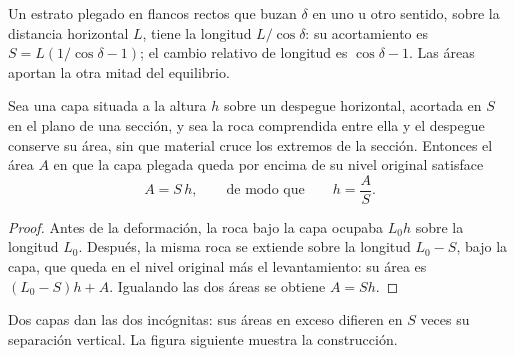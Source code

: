 Un estrato plegado en flancos rectos que buzan $\delta$ en uno u otro sentido, sobre la
distancia horizontal $L$, tiene la longitud $L/\cos\delta$: su acortamiento es
$S = L(1/\cos\delta - 1)$; el cambio relativo de longitud es $\cos\delta - 1$.
Las áreas aportan la otra mitad del equilibrio.

\begin{proposition}\label{prop:b3:structural-analysis:detachment}
Sea una capa situada a la altura $h$ sobre un despegue horizontal, acortada en $S$
en el plano de una sección, y sea la roca comprendida entre ella y el despegue
conserve su área, sin que material cruce los extremos de la sección. Entonces el
área $A$ en que la capa plegada queda por encima de su nivel original satisface
\[
  A = S\,h , \qquad\text{de modo que}\qquad h = \frac AS .
\]
\end{proposition}

\begin{proof}
Antes de la deformación, la roca bajo la capa ocupaba $L_0 h$ sobre la
longitud $L_0$. Después, la misma roca se extiende sobre la longitud $L_0 - S$, bajo
la capa, que queda en el nivel original más el levantamiento: su área es
$(L_0 - S)h + A$. Igualando las dos áreas se obtiene $A = Sh$.
\end{proof}

Dos capas dan las dos incógnitas: sus áreas en exceso difieren en $S$ veces su
separación vertical. La figura siguiente muestra la construcción.

